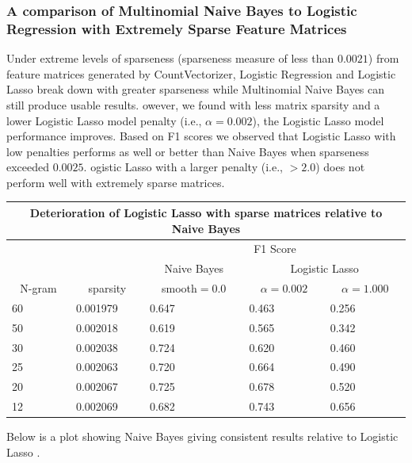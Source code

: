 \documentclass[11pt]{article}
\newcommand{\vertSpace}[1]{\vspace{3mm}}
\begin{document}
{\subsubsection{A comparison of Multinomial Naive Bayes to Logistic Regression with Extremely Sparse Feature Matrices}
\noindent
Under extreme levels of sparseness (sparseness measure of less than $0.0021$) from feature matrices generated by CountVectorizer, Logistic Regression and Logistic Lasso break down with greater sparseness while Multinomial Naive Bayes can still produce usable results. \vertSpace


However, we found with less matrix sparsity and a lower Logistic Lasso model penalty (i.e., $\alpha=0.002$), the Logistic Lasso model performance improves.  Based on F1 scores we observed that Logistic Lasso with low penalties performs as well or better than Naive Bayes when sparseness exceeded $0.0025$.  \vertSpace


Logistic Lasso with a larger penalty (i.e., $>2.0$) does not perform well with extremely sparse matrices. \\
\begin{center}
\noindent \begin{tabular}{ |p{2cm}||p{2cm}|p{2cm}|p{2cm}|p{2cm}|  }
 \hline

 \multicolumn{5}{|c|}{Deterioration of Logistic Lasso with sparse matrices relative to Naive Bayes} \\
 \hline
 \multicolumn{1}{|c|}{} &
 \multicolumn{1}{|c|}{} &
 \multicolumn{3}{|c|}{F1 Score} \\

 \hline
 \multicolumn{1}{|c|}{} &
 \multicolumn{1}{|c|}{} &
 \multicolumn{1}{|c|}{Naive Bayes} &
 \multicolumn{2}{|c|}{Logistic Lasso} \\

 \hline
 \multicolumn{1}{|c|}{N-gram} &
 \multicolumn{1}{|c|}{sparsity} &
 \multicolumn{1}{|c|}{smooth$=0.0$} &
 \multicolumn{1}{|c|}{$\alpha=0.002$} &
 \multicolumn{1}{|c|}{$\alpha=1.000$} \\
 \hline
 60& 0.001979 & 0.647 & 0.463 & 0.256\\
 50& 0.002018 & 0.619 & 0.565 & 0.342\\
 30& 0.002038 & 0.724 & 0.620 & 0.460\\
 25& 0.002063 & 0.720 & 0.664 & 0.490\\
 20& 0.002067 & 0.725 & 0.678 & 0.520\\
 12& 0.002069 & 0.682 & 0.743 & 0.656\\
 \hline
\end{tabular}
\end{center}
\vertSpace
\noindent Below is a plot showing Naive Bayes giving consistent results relative
to Logistic Lasso .

}
\end{document}
